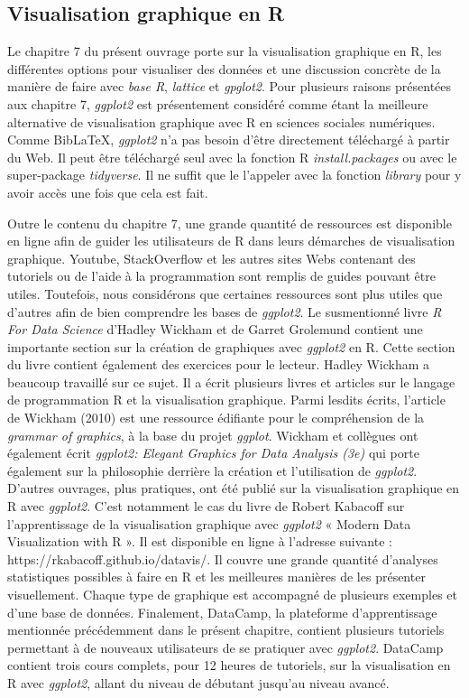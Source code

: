 \documentclass[
  letterpaper,
  DIV=11,
  numbers=noendperiod]{scrreprt}
\begin{document}
\hypertarget{visualisation-graphique-en-r}{%
\subsection{Visualisation graphique en
R}\label{visualisation-graphique-en-r}}

Le chapitre 7 du présent ouvrage porte sur la visualisation graphique en
R, les différentes options pour visualiser des données et une discussion
concrète de la manière de faire avec \emph{base R}, \emph{lattice} et
\emph{gpglot2}. Pour plusieurs raisons présentées aux chapitre 7,
\emph{ggplot2} est présentement considéré comme étant la meilleure
alternative de visualisation graphique avec R en sciences sociales
numériques. Comme BibLaTeX, \emph{ggplot2} n'a pas besoin d'être
directement téléchargé à partir du Web. Il peut être téléchargé seul
avec la fonction R \emph{install.packages} ou avec le super-package
\emph{tidyverse}. Il ne suffit que le l'appeler avec la fonction
\emph{library} pour y avoir accès une fois que cela est fait.

Outre le contenu du chapitre 7, une grande quantité de ressources est
disponible en ligne afin de guider les utilisateurs de R dans leurs
démarches de visualisation graphique. Youtube, StackOverflow et les
autres sites Webs contenant des tutoriels ou de l'aide à la
programmation sont remplis de guides pouvant être utiles. Toutefois,
nous considérons que certaines ressources sont plus utiles que d'autres
afin de bien comprendre les bases de \emph{ggplot2}. Le susmentionné
livre \emph{R For Data Science} d'Hadley Wickham et de Garret Grolemund
contient une importante section sur la création de graphiques avec
\emph{ggplot2} en R. Cette section du livre contient également des
exercices pour le lecteur. Hadley Wickham a beaucoup travaillé sur ce
sujet. Il a écrit plusieurs livres et articles sur le langage de
programmation R et la visualisation graphique. Parmi lesdits écrits,
l'article de Wickham (2010) est une ressource édifiante pour le
compréhension de la \emph{grammar of graphics}, à la base du projet
\emph{ggplot}. Wickham et collègues ont également écrit \emph{ggplot2:
Elegant Graphics for Data Analysis (3e)} qui porte également sur la
philosophie derrière la création et l'utilisation de \emph{ggplot2}.
D'autres ouvrages, plus pratiques, ont été publié sur la visualisation
graphique en R avec \emph{ggplot2}. C'est notamment le cas du livre de
Robert Kabacoff sur l'apprentissage de la visualisation graphique avec
\emph{ggplot2} « Modern Data Visualization with R ». Il est disponible
en ligne à l'adresse suivante : https://rkabacoff.github.io/datavis/. Il
couvre une grande quantité d'analyses statistiques possibles à faire en
R et les meilleures manières de les présenter visuellement. Chaque type
de graphique est accompagné de plusieurs exemples et d'une base de
données. Finalement, DataCamp, la plateforme d'apprentissage mentionnée
précédemment dans le présent chapitre, contient plusieurs tutoriels
permettant à de nouveaux utilisateurs de se pratiquer avec
\emph{ggplot2}. DataCamp contient trois cours complets, pour 12 heures
de tutoriels, sur la visualisation en R avec \emph{ggplot2}, allant du
niveau de débutant jusqu'au niveau avancé.
\end{document}
